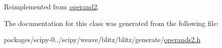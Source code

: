 Reimplemented from \hyperlink{classoperand2_a015087f4a02e9b3b878bf12d255cbd34}{operand2}.



The documentation for this class was generated from the following file\+:\begin{DoxyCompactItemize}
\item 
packages/scipy-\/0../scipy/weave/blitz/blitz/generate/\hyperlink{operands2_8h}{operands2.\+h}\end{DoxyCompactItemize}
